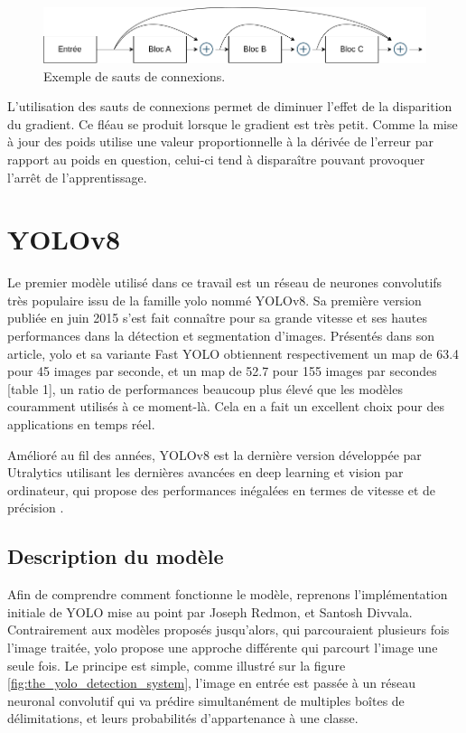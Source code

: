 \begin{figure}[hbt!]
    \centering
    \includegraphics[scale=0.45]{Figures/skip_connections.png}
    \caption{Exemple de sauts de connexions.}
    \label{fig:skip_connections}
\end{figure}

L'utilisation des sauts de connexions permet de diminuer l'effet de la disparition du gradient. Ce fléau se produit lorsque le gradient est très petit. Comme la mise à jour des poids utilise une valeur proportionnelle à la dérivée de l'erreur par rapport au poids en question, celui-ci tend à disparaître pouvant provoquer l'arrêt de l'apprentissage.

\newpage

\section{YOLOv8}
\label{sec:yolov8}

Le premier modèle utilisé dans ce travail est un réseau de neurones convolutifs très populaire issu de la famille \acrfull{yolo} nommé YOLOv8. Sa première version publiée en juin 2015 \cite{redmon_you_2016} s'est fait connaître pour sa grande vitesse et ses hautes performances dans la détection et segmentation d'images. Présentés dans son article, \acrshort{yolo} et sa variante Fast YOLO obtiennent respectivement un \acrshort{map} de 63.4 pour 45 images par seconde, et un \acrshort{map} de 52.7 pour 155 images par secondes [table 1], un ratio de performances beaucoup plus élevé que les modèles couramment utilisés à ce moment-là. Cela en a fait un excellent choix pour des applications en temps réel.

Amélioré au fil des années, YOLOv8 est la dernière version développée par Utralytics utilisant les dernières avancées en deep learning et vision par ordinateur, qui propose des performances inégalées en termes de vitesse et de précision \cite{ultralytics_home_nodate}.

\subsection{Description du modèle}

Afin de comprendre comment fonctionne le modèle, reprenons l'implémentation initiale de YOLO mise au point par Joseph Redmon, et Santosh Divvala. Contrairement aux modèles proposés jusqu'alors, qui parcouraient plusieurs fois l'image traitée, \acrshort{yolo} propose une approche différente qui parcourt l'image une seule fois. Le principe est simple, comme illustré sur la figure \ref{fig:the_yolo_detection_system}, l'image en entrée est passée à un réseau neuronal convolutif qui va prédire simultanément de multiples boîtes de délimitations, et leurs probabilités d'appartenance à une classe.

